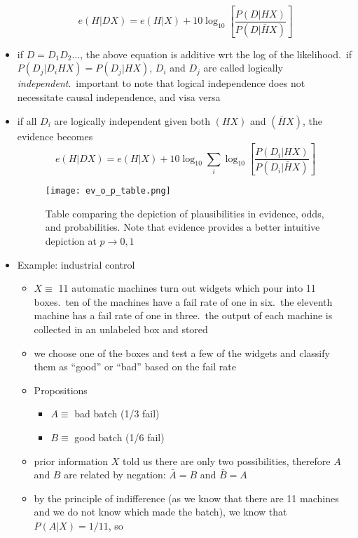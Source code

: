 \documentclass[../jaynes_prob_theory_notes.tex]{subfiles}
\begin{document}
\begin{itemize}
\begin{equation*}
            e(H|DX) = e(H|X) + 10\log_{10}\left[ \frac{P(D|HX)}{P(D|\bar{H}X)} \right]
        \end{equation*}
    \item if $D = D_1D_2\ldots$, the above equation is additive wrt the log of the likelihood.\ if $P(D_j|D_{i}HX) = P(D_j|HX)$, $D_i$ and $D_j$ are called logically \textit{independent}.\ important to note that logical independence does not necessitate causal independence, and visa versa 
    \item if all $D_i$ are logically independent given both $(HX)$ and $(\bar{H}X)$, the evidence becomes
        \begin{equation}
            \label{sum_of_likelihoods}
            e(H|DX) = e(H|X) + 10\log_{10}\sum_{i}\log_{10} \left[ \frac{P(D_i|HX)}{P(D_i|\bar{H}X)} \right]
        \end{equation}
		\begin{figure*}[h!]
			\centering
			\texttt{[image: ev\_o\_p\_table.png]}
			\caption{Table comparing the depiction of plausibilities in evidence, odds, and probabilities. Note that evidence provides a better intuitive depiction at $p \rightarrow 0, 1$}
		\end{figure*}
	\item Example: industrial control
	\begin{itemize}
		\item[] $X \equiv$ 11  automatic machines turn out widgets which pour into 11 boxes.\ ten of the machines have a fail rate of one in six.\ the eleventh machine has a fail rate of one in three.\ the output of each machine is collected in an unlabeled box and stored
		\item we choose one of the boxes and test a few of the widgets and classify them as ``good'' or ``bad'' based on the fail rate
		\item Propositions
			\begin{itemize}
				\item[] $A\equiv$ bad batch (1/3 fail)
				\item[] $B\equiv$ good batch (1/6 fail)
			\end{itemize}
		\item prior information $X$ told us there are only two possibilities, therefore $A$ and $B$ are related by negation: $\bar{A} = B$ and $\bar{B} = A$
		\item by the principle of indifference (as we know that there are 11 machines and we do not know which made the batch), we know that $P(A|X) = 1/11$, so

\end{itemize}
\end{itemize}
\end{document}
